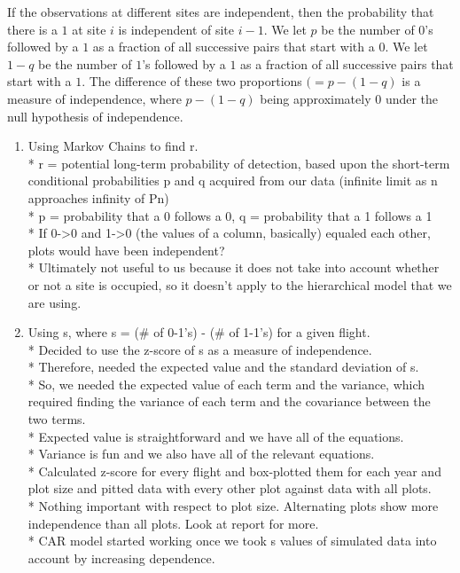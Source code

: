 \documentclass{article}
\begin{document}
		If the observations at different sites are independent, then the 
probability that there is a \(1\) at site \(i\)  is independent of site \(i-1\).  
We let \(p\) be the number of \(0\)'s followed by a \(1\) as a fraction of all 
successive pairs that start with a \(0\).  We let \(1-q\) be the number of \(1\)'s
followed by a \(1\) as a fraction of all successive pairs that start with a \(1\).
The difference of these two proportions \((=p-(1-q)\) is a measure of independence,
where \(p-(1-q)\) being approximately \(0\) under the null hypothesis of 
independence.  
	\begin{enumerate}
    	\item Using Markov Chains to find r. \\
          * r = potential long-term probability of detection, based upon the 
			short-term conditional probabilities p and q acquired from our data 
			(infinite limit as n approaches infinity of Pn) \\
          * p = probability that a 0 follows a 0, q = probability that a 1 follows
			 a 1  \\
          * If 0->0 and 1->0 (the values of a column, basically) equaled each 
			other, plots would have been independent?  \\
          * Ultimately not useful to us because it does not take into account 
			whether or not a site is occupied, so it doesn't apply to the 
			hierarchical model that we are using. \\
   		\item Using s, where s = (\# of 0-1's) - (\# of 1-1's) for a given flight.\\
          * Decided to use the z-score of s as a measure of independence.  \\
          * Therefore, needed the expected value and the standard deviation of s. \\
          * So, we needed the expected value of each term and the variance, which 
			required finding the variance of each term and the covariance between 
			the two terms. \\
          * Expected value is straightforward and we have all of the equations. \\
          * Variance is fun and we also have all of the relevant equations. \\
          * Calculated z-score for every flight and box-plotted them for each year
			and plot size and pitted data with every other plot against data with
			all plots. \\
          * Nothing important with respect to plot size. Alternating plots show 
			more independence than all plots. Look at report for more. \\
          * CAR model started working once we took s values of simulated data into
			account by increasing dependence.  \\
	\end{enumerate}
\end{document}
